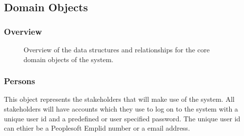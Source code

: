 \documentclass[12pt]{article}
\begin{document}

\subsection{Domain Objects} %
\subsubsection{Overview}

\begin{figure}[H]
\centering	
{}
\caption{Overview of the data structures and relationships for the core domain objects of the
system.}
\end{figure}

\newpage
\subsubsection{Persons}
This object represents the stakeholders that will make use of the system. All stakeholders will have accounts which they use to log on to the system with a unique user id and a predefined or user specified password. The unique user id can ethier be a Peoplesoft Emplid number or a email address.\\
\end{document}
